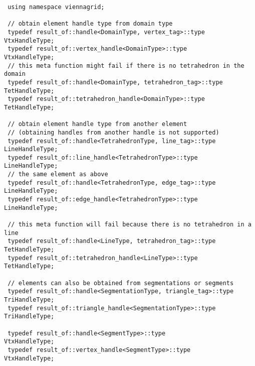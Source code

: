\begin{lstlisting}
 using namespace viennagrid;
 
 // obtain element handle type from domain type
 typedef result_of::handle<DomainType, vertex_tag>::type    VtxHandleType;
 typedef result_of::vertex_handle<DomainType>::type         VtxHandleType;
 // this meta function might fail if there is no tetrahedron in the domain
 typedef result_of::handle<DomainType, tetrahedron_tag>::type TetHandleType;
 typedef result_of::tetrahedron_handle<DomainType>::type    TetHandleType;
 
 // obtain element handle type from another element
 // (obtaining handles from another handle is not supported)
 typedef result_of::handle<TetrahedronType, line_tag>::type LineHandleType;
 typedef result_of::line_handle<TetrahedronType>::type      LineHandleType;
 // the same element as above
 typedef result_of::handle<TetrahedronType, edge_tag>::type LineHandleType;
 typedef result_of::edge_handle<TetrahedronType>::type      LineHandleType;
 
 // this meta function will fail because there is no tetrahedron in a line
 typedef result_of::handle<LineType, tetrahedron_tag>::type TetHandleType;
 typedef result_of::tetrahedron_handle<LineType>::type      TetHandleType;
 
 // elements can also be obtained from segmentations or segments
 typedef result_of::handle<SegmentationType, triangle_tag>::type TriHandleType;
 typedef result_of::triangle_handle<SegmentationType>::type TriHandleType;
 
 typedef result_of::handle<SegmentType>::type               VtxHandleType;
 typedef result_of::vertex_handle<SegmentType>::type        VtxHandleType;
\end{lstlisting}



